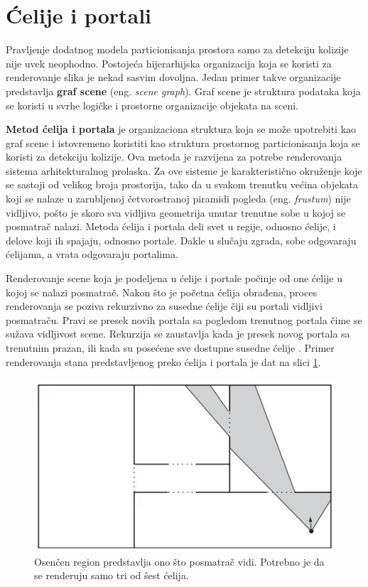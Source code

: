 \documentclass[12pt,oneside]{memoir}
\begin{document}
\section{Ćelije i portali}
\label{subsec:cells}

Pravljenje dodatnog modela particionisanja prostora samo za detekciju kolizije nije uvek neophodno.
Postojeća hijerarhijska organizacija koja se koristi za renderovanje slika je nekad sasvim dovoljna.
Jedan primer takve organizacije predstavlja \textbf{graf scene} (eng. {\em scene graph}).
Graf scene je struktura podataka koja se koristi u svrhe logičke i prostorne organizacije objekata na sceni.

\textbf{Metod ćelija i portala}  je organizaciona struktura koja se može upotrebiti kao graf scene
i istovremeno koristiti kao struktura prostornog particionisanja koja se koristi za detekciju kolizije.
Ova metoda je razvijena za potrebe renderovanja sistema arhitekturalnog prolaska. 
Za ove sisteme je karakteristično okruženje koje se sastoji od velikog broja prostorija, tako da u svakom trenutku
većina objekata koji se nalaze u zarubljenoj četvorostranoj piramidi pogleda (eng. {\em frustum})
nije vidljivo, pošto je skoro sva vidljiva geometrija unutar trenutne sobe u kojoj se posmatrač nalazi.
Metoda ćelija i portala deli svet u regije, odnosno ćelije, i delove koji ih spajaju, odnosno portale.
Dakle u slučaju zgrada, sobe odgovaraju ćelijama, a vrata odgovaraju portalima. 

Renderovanje scene koja je podeljena u ćelije i portale počinje od one ćelije u kojoj se nalazi posmatrač. 
Nakon što je početna ćelija obrađena, proces renderovanja se poziva rekurzivno
za susedne ćelije čiji su portali vidljivi posmatraču. 
Pravi se presek novih portala sa pogledom trenutnog portala čime se sužava vidljivost scene.
Rekurzija se zaustavlja kada je presek novog portala sa trenutnim prazan, ili kada su posećene sve dostupne susedne ćelije \cite{glavnaKnjiga}.
Primer renderovanja stana predstavljenog preko ćelija i portala je dat na slici \ref{fig:cellsRooms}.

\begin{figure}[h!]
	\begin{center}
	\includegraphics[scale=1]{cellsRooms.jpg}
	\end{center}
	\caption{
	Osenčen region predstavlja ono što posmatrač vidi. 
	Potrebno je da se renderuju samo tri od šest ćelija. }
	\label{fig:cellsRooms}
\end{figure}
\end{document}
